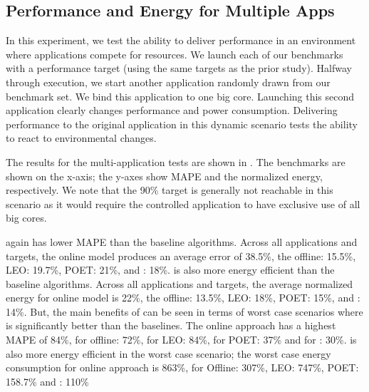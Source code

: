 



\subsection{Performance and Energy for Multiple Apps}
In this experiment, we test the ability to deliver performance in an
environment where applications compete for resources.  We launch each
of our benchmarks with a performance target (using the same targets as
the prior study).  Halfway through execution, we start another
application randomly drawn from our benchmark set.  We bind this
application to one big core.  Launching this second application
clearly changes performance and power consumption.  Delivering
performance to the original application in this dynamic scenario tests
the ability to react to environmental changes.

The results for the multi-application tests are shown in
.  The benchmarks are shown
on the x-axis; the y-axes show MAPE and the normalized energy,
respectively.  We note that the 90\% target is generally not reachable
in this scenario as it would require the controlled application to
have exclusive use of all big cores.


\SYSTEM{} again has lower MAPE than the baseline algorithms. Across
all applications and targets, the online model produces an average
error of 38.5\%, the offline: 15.5\%, LEO: 19.7\%, POET: 21\%, and
\SYSTEM{}: 18\%. \SYSTEM{} is also more energy efficient than the
baseline algorithms. Across all applications and targets, the average
normalized energy for online model is 22\%, the offline: 13.5\%, LEO:
18\%, POET: 15\%, and \SYSTEM{}: 14\%. But, the main benefits of
\SYSTEM{} can be seen in terms of worst case scenarios where \SYSTEM{}
is significantly better than the baselines. The online approach has a
highest MAPE of 84\%, for offline: 72\%, for LEO: 84\%, for POET: 37\%
and for \SYSTEM{}: 30\%. \SYSTEM{} is also more energy efficient in
the worst case scenario; the worst case energy consumption for online
approach is 863\%, for Offline: 307\%, LEO: 747\%, POET: 158.7\% and
\SYSTEM{}: 110\%

